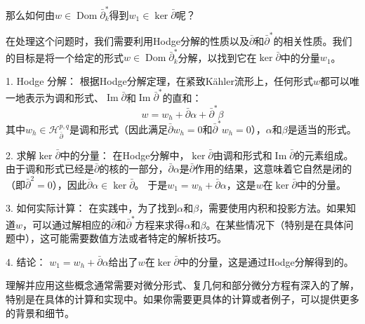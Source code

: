 \documentclass[lang=cn,zihao=-4,a4paper,fontset=none]{beautybook}
\begin{document}
那么如何由$w\in \operatorname{Dom} \bar\partial^*_k$得到$w_1\in \ker \bar\partial$呢？
\begin{solution}
    在处理这个问题时，我们需要利用Hodge分解的性质以及$\bar{\partial}$和$\bar{\partial}^*$的相关性质。我们的目标是将一个给定的形式$w \in \operatorname{Dom} \bar{\partial}^*_k$分解，以找到它在$\ker \bar{\partial}$中的分量$w_1$。

1. Hodge 分解：
    根据Hodge分解定理，在紧致Kähler流形上，任何形式$w$都可以唯一地表示为调和形式、$\operatorname{Im} \bar{\partial}$和$\operatorname{Im} \bar{\partial}^*$的直和：
     $$
     w = w_h + \bar{\partial} \alpha + \bar{\partial}^* \beta
     $$
   其中$w_h \in \mathcal{H}_{\bar{\partial}}^{p,q}$是调和形式（因此满足$\bar{\partial} w_h = 0$和$\bar{\partial}^* w_h = 0$），$\alpha$和$\beta$是适当的形式。

2. 求解$\ker \bar{\partial}$中的分量：
    在Hodge分解中，$\ker \bar{\partial}$由调和形式和$\operatorname{Im} \bar{\partial}$的元素组成。由于调和形式已经是$\bar{\partial}$的核的一部分，$\bar{\partial} \alpha$是$\bar{\partial}$作用的结果，这意味着它自然是闭的（即$\bar{\partial}^2 = 0$），因此$\bar{\partial} \alpha \in \ker \bar{\partial}$。
    于是$w_1 = w_h + \bar{\partial} \alpha$，这是$w$在$\ker \bar{\partial}$中的分量。

3. 如何实际计算：
    在实践中，为了找到$\alpha$和$\beta$，需要使用内积和投影方法。如果知道$w$，可以通过解相应的$\bar{\partial}$和$\bar{\partial}^*$方程来求得$\alpha$和$\beta$。在某些情况下（特别是在具体问题中），这可能需要数值方法或者特定的解析技巧。

4. 结论：
    $w_1 = w_h + \bar{\partial} \alpha$给出了$w$在$\ker \bar{\partial}$中的分量，这是通过Hodge分解得到的。

理解并应用这些概念通常需要对微分形式、复几何和部分微分方程有深入的了解，特别是在具体的计算和实现中。如果你需要更具体的计算或者例子，可以提供更多的背景和细节。
\end{solution}
    



{\normalem
\printbibliography[
heading=bibintoc,
title={参考文献}
]
\printindex
\thispagestyle{empty}}
\ISBNcode{\EANisbn[ISBN=978-80-7340-097-2]} %
\makebottomcover
\end{document}
